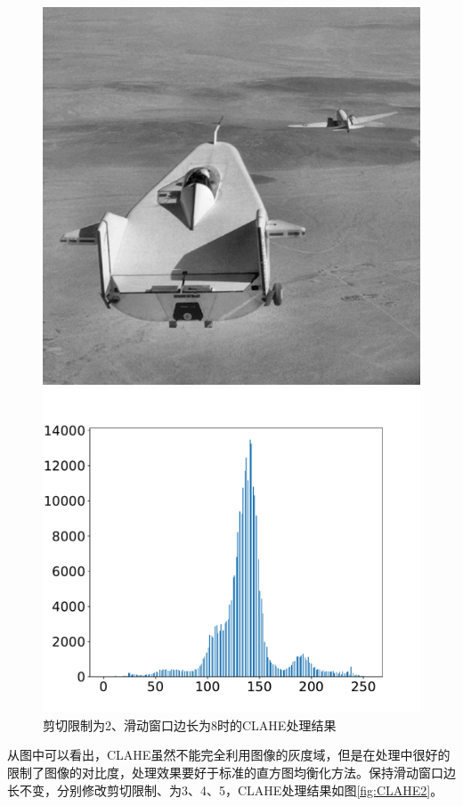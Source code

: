 \documentclass[a4paper]{ctexart}
\begin{document}
\begin{spacing}{1.35}
	\begin{figure}[htbp]
		\centering
		\begin{minipage}[t]{0.351\textwidth}
			\centering
			\includegraphics[width=\textwidth]{figure/1_clip_limit_2.png}
		\end{minipage}
		\begin{minipage}[t]{0.44\textwidth}
			\centering
			\includegraphics[width=\textwidth]{figure/CLAHEhist_1.pdf}
		\end{minipage}
		\caption{剪切限制为2、滑动窗口边长为8时的CLAHE处理结果}
		\label{fig:CLAHE1}
	\end{figure}
	从图中可以看出，CLAHE虽然不能完全利用图像的灰度域，但是在处理中很好的限制了图像的对比度，处理效果要好于标准的直方图均衡化方法。保持滑动窗口边长不变，分别修改剪切限制、为3、4、5，CLAHE处理结果如图\ref{fig:CLAHE2}。


\end{spacing}
\end{document}
